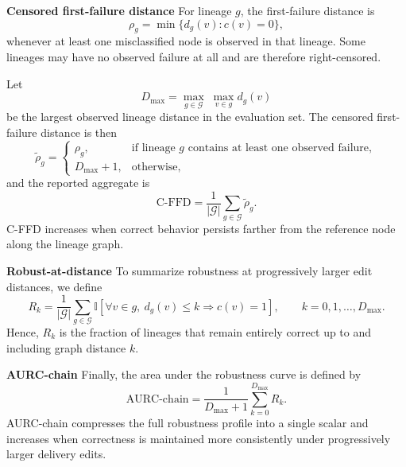 \noindent\textbf{Censored first-failure distance} For lineage $g$, the first-failure distance is
\begin{equation}
\rho_g = \min\{d_g(v): c(v)=0\},
\label{eq:ffd}
\end{equation}
whenever at least one misclassified node is observed in that lineage. Some lineages may have no observed failure at all and are therefore right-censored.

Let
\begin{equation}
D_{\max} = \max_{g \in \mathcal{G}}\; \max_{v \in g} d_g(v)
\label{eq:dmax}
\end{equation}
be the largest observed lineage distance in the evaluation set. The censored first-failure distance is then
\begin{equation}
\tilde{\rho}_g =
\begin{cases}
\rho_g, & \text{if lineage } g \text{ contains at least one observed failure},\\
D_{\max}+1, & \text{otherwise},
\end{cases}
\label{eq:censored_ffd_lineage}
\end{equation}
and the reported aggregate is
\begin{equation}
\mathrm{C\mbox{-}FFD} =
\frac{1}{|\mathcal{G}|}
\sum_{g \in \mathcal{G}}
\tilde{\rho}_g.
\label{eq:cffd}
\end{equation}
C-FFD increases when correct behavior persists farther from the reference node along the lineage graph.

\noindent\textbf{Robust-at-distance} To summarize robustness at progressively larger edit distances, we define
\begin{equation}
R_k =
\frac{1}{|\mathcal{G}|}
\sum_{g \in \mathcal{G}}
\mathbb{I}\!\left[
\forall v \in g,\ d_g(v) \le k \Rightarrow c(v)=1
\right],
\qquad k=0,1,\ldots,D_{\max}.
\label{eq:robust_at_k}
\end{equation}
Hence, $R_k$ is the fraction of lineages that remain entirely correct up to and including graph distance $k$.

\noindent\textbf{AURC-chain} Finally, the area under the robustness curve is defined by
\begin{equation}
\mathrm{AURC\mbox{-}chain} =
\frac{1}{D_{\max}+1}
\sum_{k=0}^{D_{\max}} R_k.
\label{eq:aurc_chain}
\end{equation}
AURC-chain compresses the full robustness profile into a single scalar and increases when correctness is maintained more consistently under progressively larger delivery edits.
